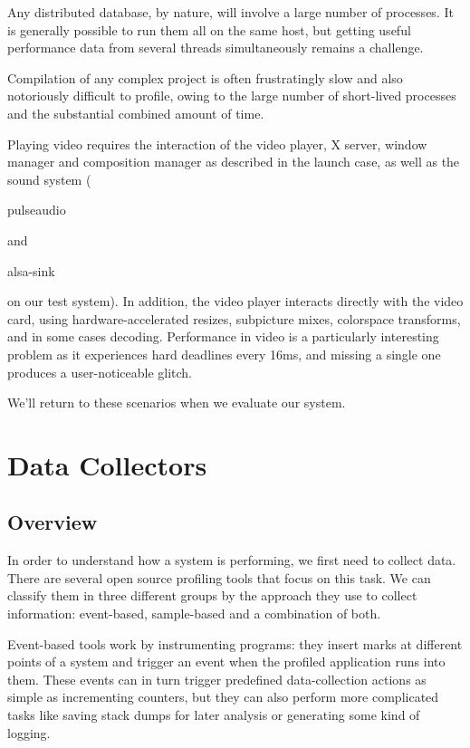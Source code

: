 \documentclass[10pt]{article}
\begin{document}
Any distributed database, by nature, will involve a large number of processes.
It is generally possible to run them all on the same host, but getting useful
performance data from several threads simultaneously remains a challenge.

Compilation of any complex project is often frustratingly slow and also
notoriously difficult to profile, owing to the large number of short-lived
processes and the substantial combined amount of time.

Playing video requires the interaction of the video player, X server, window
manager and composition manager as described in the launch case, as well as the
sound system (\begin{tt}pulseaudio\end{tt} and \begin{tt}alsa-sink\end{tt} on
our test system). In addition, the video player interacts directly with the
video card, using hardware-accelerated resizes, subpicture mixes, colorspace
transforms, and in some cases decoding. Performance in video is a
particularly interesting problem as it experiences hard deadlines every 16ms,
and missing a single one produces a user-noticeable glitch.

We'll return to these scenarios when we evaluate our system.

\section{Data Collectors}

\subsection{Overview}

In order to understand how a system is performing, we first need to collect
data. There are several open source profiling tools that focus on this task. We
can classify them in three different groups by the approach they use to collect
information: event-based, sample-based and a combination of both.

Event-based tools work by instrumenting programs: they insert marks at
different points of a system and trigger an event when the profiled application
runs into them. These events can in turn trigger predefined data-collection
actions as simple as incrementing counters, but they can also perform more
complicated tasks like saving stack dumps for later analysis or generating some
kind of logging.
\end{document}
